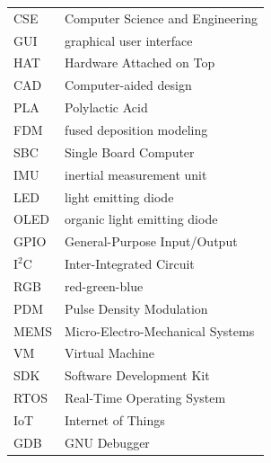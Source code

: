 \header{\headerabbreviations}
\setlongtables
\begin{longtable}[l]{p{3cm}p{}}

    CSE & Computer Science and Engineering\\
    GUI & graphical user interface\\
    HAT & Hardware Attached on Top\\
    CAD & Computer-aided design\\
    PLA & Polylactic Acid\\
    FDM & fused deposition modeling\\
    SBC & Single Board Computer\\
    IMU & inertial measurement unit\\
    LED & light emitting diode\\
    OLED & organic light emitting diode\\
    GPIO & General-Purpose Input/Output\\
    $\text{I}^2\text{C}$ & Inter-Integrated Circuit\\
    RGB & red-green-blue\\
    PDM & Pulse Density Modulation\\
    MEMS & Micro-Electro-Mechanical Systems\\
    VM & Virtual Machine\\
    SDK & Software Development Kit\\
    RTOS & Real-Time Operating System\\
    IoT & Internet of Things \\
    GDB & GNU Debugger \\

\end{longtable}
\setcounter{table}{0}
